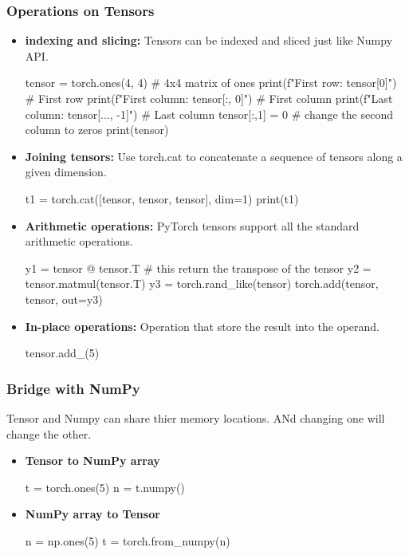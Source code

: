\documentclass[12pt,hyperref,a4paper,UTF8]{article}
\begin{document}
\subsubsection{Operations on Tensors}
\begin{itemize}
    \item \textbf{indexing and slicing:} Tensors can be indexed and sliced just like Numpy API.
          \begin{python}
              tensor = torch.ones(4, 4) # 4x4 matrix of ones
              print(f"First row: {tensor[0]}") # First row
              print(f"First column: {tensor[:, 0]}") # First column
              print(f"Last column: {tensor[..., -1]}")  # Last column
              tensor[:,1] = 0 # change the second column to zeros
              print(tensor)
          \end{python}
    \item \textbf{Joining tensors:} Use torch.cat to concatenate a sequence of tensors along a given dimension.
          \begin{python}
              t1 = torch.cat([tensor, tensor, tensor], dim=1)
              print(t1)
          \end{python}
    \item \textbf{Arithmetic operations:} PyTorch tensors support all the standard arithmetic operations.
          \begin{python}
              y1 = tensor @ tensor.T # this return the transpose of the tensor
              y2 = tensor.matmul(tensor.T)
              y3 = torch.rand_like(tensor)
              torch.add(tensor, tensor, out=y3)
          \end{python}
    \item \textbf{In-place operations:} Operation that store the result into the operand.
          \begin{python}
              tensor.add_(5)
          \end{python}
\end{itemize}

\subsubsection{Bridge with NumPy}
Tensor and Numpy can share thier memory locations. ANd changing one will change the other.
\begin{itemize}
    \item \textbf{Tensor to NumPy array}
          \begin{python}
              t = torch.ones(5)
              n = t.numpy()
          \end{python}
    \item \textbf{NumPy array to Tensor}
          \begin{python}
              n = np.ones(5)
              t = torch.from_numpy(n)
          \end{python}
\end{itemize}
\end{document}
